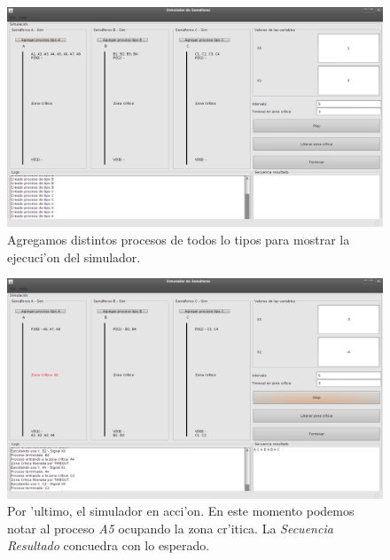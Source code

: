 \begin{figure}[h!]
\centering
 \includegraphics[scale=0.33,keepaspectratio=true]{./imagenes/semaforo/semaforos5.png}
 \caption{Agregamos distintos procesos de todos lo tipos para mostrar la ejecuci'on del simulador.}
\end{figure}

\begin{figure}[h!]
\centering
 \includegraphics[scale=0.33,keepaspectratio=true]{./imagenes/semaforo/semaforos6.png}
 \caption{Por 'ultimo, el simulador en acci'on. En este momento podemos notar al proceso \emph{A5} ocupando la zona cr'itica. La \emph{Secuencia Resultado} concuedra con lo esperado.}
\end{figure}

